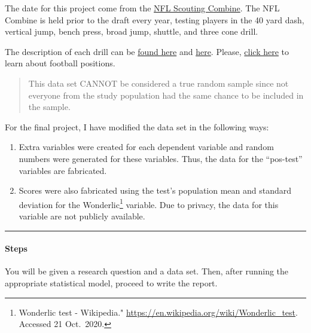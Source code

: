 \documentclass[11pt,]{article}
\begin{document}
The date for this project come from the
\href{https://en.wikipedia.org/wiki/NFL_Scouting_Combine}{NFL Scouting
Combine}. The NFL Combine is held prior to the draft every year, testing
players in the 40 yard dash, vertical jump, bench press, broad jump,
shuttle, and three cone drill.

The description of each drill can be
\href{https://nflcombineresults.com/nfl-combine-drills-101-what-each-drill-measures/}{found
here} and
\href{https://www.espn.com/nfl/draft2018/story/_/id/22587931/guide-nfl-draft-combine-drills-todd-mcshay-numbers-know-40-yard-dash-short-shuttle-bench-press}{here}.
Please,
\href{https://protips.dickssportinggoods.com/sports-and-activities/football/football-101-football-positions-and-their-roles}{click
here} to learn about football positions.

\begin{quote}
This data set CANNOT be considered a true random sample since not
everyone from the study population had the same chance to be included in
the sample.
\end{quote}

For the final project, I have modified the data set in the following
ways:

\begin{enumerate}
\def\labelenumi{\arabic{enumi}.}
\item
  Extra variables were created for each dependent variable and random
  numbers were generated for these variables. Thus, the data for the
  ``pos-test'' variables are fabricated.
\item
  Scores were also fabricated using the test's population mean and
  standard deviation for the Wonderlic\footnote{Wonderlic test -
    Wikipedia." \url{https://en.wikipedia.org/wiki/Wonderlic_test}.
    Accessed 21 Oct.~2020.} variable. Due to privacy, the data for this
  variable are not publicly available.
\end{enumerate}

\begin{center}\rule{0.5\linewidth}{0.5pt}\end{center}

\hypertarget{steps}{%
\paragraph{Steps}\label{steps}}

You will be given a research question and a data set. Then, after
running the appropriate statistical model, proceed to write the report.
\end{document}

